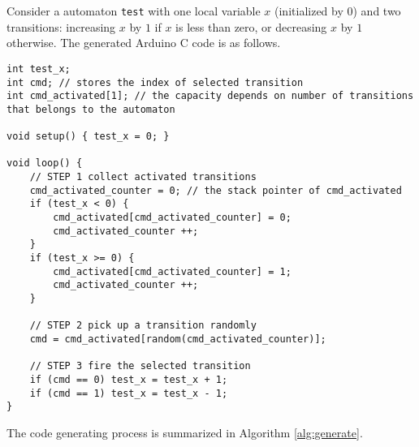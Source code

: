 \begin{example}
    Consider a \lang{} automaton \texttt{test} with one local variable $x$ (initialized by $0$) and two transitions: increasing $x$ by $1$ if $x$ is less than zero, or decreasing $x$ by $1$ otherwise. The generated Arduino C code is as follows.
    \begin{lstlisting}
int test_x;
int cmd; // stores the index of selected transition
int cmd_activated[1]; // the capacity depends on number of transitions that belongs to the automaton

void setup() { test_x = 0; }

void loop() {
    // STEP 1 collect activated transitions
    cmd_activated_counter = 0; // the stack pointer of cmd_activated
    if (test_x < 0) {
        cmd_activated[cmd_activated_counter] = 0;
        cmd_activated_counter ++;
    }
    if (test_x >= 0) {
        cmd_activated[cmd_activated_counter] = 1;
        cmd_activated_counter ++;
    }

    // STEP 2 pick up a transition randomly
    cmd = cmd_activated[random(cmd_activated_counter)];

    // STEP 3 fire the selected transition
    if (cmd == 0) test_x = test_x + 1;
    if (cmd == 1) test_x = test_x - 1;
}
    \end{lstlisting}
\end{example}
The code generating process is summarized in Algorithm \ref{alg:generate}.

